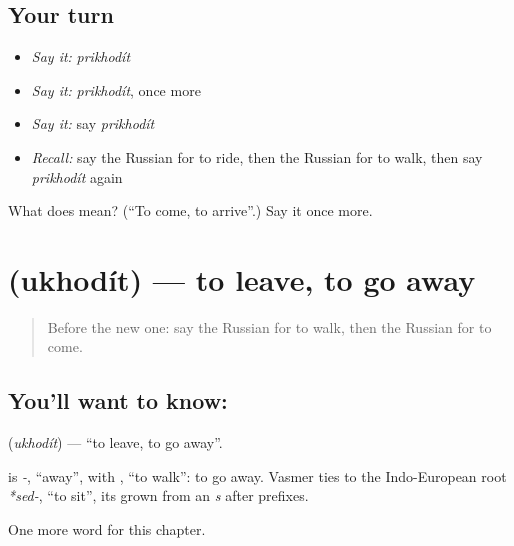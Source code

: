 \subsection*{Your turn}
\begin{itemize}
\raggedright
  \item \emph{Say it:} \emph{prikhodít}
  \item \emph{Say it:} \emph{prikhodít}, once more
  \item \emph{Say it:} say \emph{prikhodít}
  \item \emph{Recall:} say the Russian for to ride, then the Russian for to walk, then say \emph{prikhodít} again
\end{itemize}

\begin{tcolorbox}[breakable,colback=teal!4,colframe=teal!35!black,title={Before you move on}]
What does  mean? (\textquotedblleft{}To come, to arrive\textquotedblright{}.) Say it once more.
\end{tcolorbox}
\section[\texorpdfstring{\ru{уходить} (ukhodít)}{уходить (ukhodít)}]{ (ukhodít) — to leave, to go away}

\label{lesson:RU-C143-ukhodit}



\begin{quote}
Before the new one: say the Russian for to walk, then the Russian for to come.
\end{quote}

\subsection*{You'll want to know: }
\textbf{} (\emph{ukhodít}) — \textquotedblleft{}to leave, to go away\textquotedblright{}.

\begin{cousinweb}
\textbf{} is \emph{-}, \textquotedblleft{}away\textquotedblright{}, with \emph{}, \textquotedblleft{}to walk\textquotedblright{}: to go away. Vasmer ties \emph{} to the Indo-European root \emph{*sed-}, \textquotedblleft{}to sit\textquotedblright{}, its \emph{} grown from an \emph{s} after prefixes.
\end{cousinweb}

\begin{grammarlens}[title={What you've built}]
One more word for this chapter.
\end{grammarlens}

